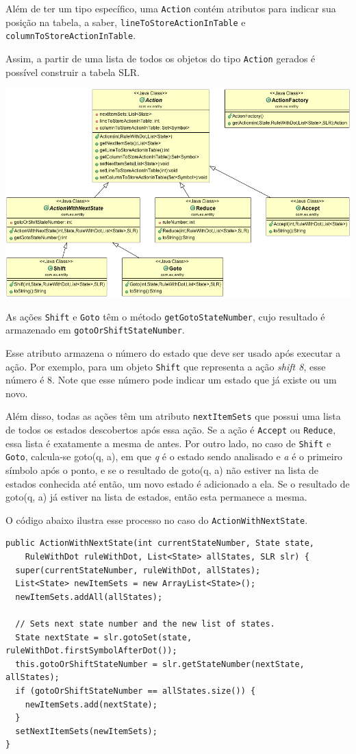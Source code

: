 \documentclass[11pt]{article}
\begin{document}
Além de ter um tipo específico, uma \texttt{Action} contém atributos para indicar sua
posição na tabela, a saber, \texttt{lineToStoreActionInTable} e \texttt{columnToStoreActionInTable}.

Assim, a partir de uma lista de todos os objetos do tipo \texttt{Action} gerados é
possível construir a tabela SLR.

\includegraphics[width=.9\linewidth]{./media/actions.png}

As ações \texttt{Shift} e \texttt{Goto} têm o método \texttt{getGotoStateNumber}, cujo resultado é
armazenado em \texttt{gotoOrShiftStateNumber}.

Esse atributo armazena o número do estado que deve ser usado após executar a
ação. Por exemplo, para um objeto \texttt{Shift} que representa a ação \emph{shift 8}, esse
número é 8. Note que esse número pode indicar um estado que já existe ou um
novo.

Além disso, todas as ações têm um atributo \texttt{nextItemSets} que possui uma lista
de todos os estados descobertos após essa ação. Se a ação é  \texttt{Accept} ou
\texttt{Reduce}, essa lista é exatamente a mesma de antes. Por outro lado, no
caso de \texttt{Shift} e \texttt{Goto}, calcula-se goto(q, a), em que \emph{q} é o estado sendo
analisado e \emph{a} é o primeiro símbolo após o ponto, e se o resultado de goto(q,
a) não estiver na lista de estados conhecida até então, um novo estado é
adicionado a ela. Se o resultado de goto(q, a) já estiver na lista de estados,
então esta permanece a mesma.

O código abaixo ilustra esse processo no caso do \texttt{ActionWithNextState}.

\begin{verbatim}
public ActionWithNextState(int currentStateNumber, State state, 
    RuleWithDot ruleWithDot, List<State> allStates, SLR slr) {
  super(currentStateNumber, ruleWithDot, allStates);
  List<State> newItemSets = new ArrayList<State>();
  newItemSets.addAll(allStates);

  // Sets next state number and the new list of states.
  State nextState = slr.gotoSet(state, ruleWithDot.firstSymbolAfterDot());
  this.gotoOrShiftStateNumber = slr.getStateNumber(nextState, allStates);
  if (gotoOrShiftStateNumber == allStates.size()) {
    newItemSets.add(nextState);
  }
  setNextItemSets(newItemSets);
}
\end{verbatim}
\end{document}
